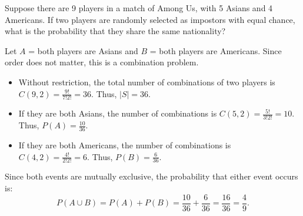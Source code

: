  
\begin{frame}[t]
\begin{ex} 
Suppose there are 9 players in a match of Among Us, with 5 Asians and 4 Americans. If two players are randomly selected as impostors with equal chance, what is the probability that they share the same nationality?
\end{ex} 
\end{frame}

\begin{frame}[t]
\begin{sol}
Let $A$ = both players are Asians and $B$ = both players are Americans. Since order does not matter, this is a combination problem.
\begin{itemize}
\item Without restriction, the total number of combinations of two players is $C(9,2) = \frac{9!}{7!2!} = 36$. Thus, $|S| = 36$. 
\item If they are both Asians, the number of combinations is $C(5,2) = \frac{5!}{3!2!} = 10$. Thus, $P(A) = \frac{10}{36}$.
\item If they are both Americans, the number of combinations is $C(4,2) = \frac{4!}{2!2!} = 6$. Thus, $P(B) = \frac{6}{36}$.
\end{itemize}
Since both events are mutually exclusive, the probability that either event occurs is:
\[ P(A \cup B) = P(A) + P(B) = \frac{10}{36} + \frac{6}{36} = \frac{16}{36} = \frac{4}{9}.\]
\end{sol}
\end{frame}


